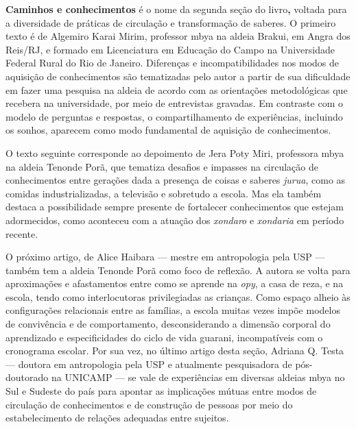 \textbf{Caminhos e conhecimentos} é o nome da segunda seção do
livro\textbf{,} voltada para a diversidade de práticas de circulação e
transformação de saberes. O primeiro texto é de Algemiro Karai Mirim,
professor mbya na aldeia Brakui, em Angra dos Reis/RJ, e formado em
Licenciatura em Educação do Campo na Universidade Federal Rural do Rio
de Janeiro. Diferenças e incompatibilidades nos modos de aquisição de
conhecimentos são tematizadas pelo autor a partir de sua dificuldade em
fazer uma pesquisa na aldeia de acordo com as orientações metodológicas
que recebera na universidade, por meio de entrevistas gravadas. Em
contraste com o modelo de perguntas e respostas, o compartilhamento de
experiências, incluindo os sonhos, aparecem como modo fundamental de
aquisição de conhecimentos.

O texto seguinte corresponde ao depoimento de Jera Poty Miri, professora
mbya na aldeia Tenonde Porã, que tematiza desafios e impasses na
circulação de conhecimentos entre gerações dada a presença de coisas e
saberes \emph{jurua}, como as comidas industrializadas, a televisão e
sobretudo a escola. Mas ela também destaca a possibilidade sempre
presente de fortalecer conhecimentos que estejam adormecidos, como
aconteceu com a atuação dos \emph{xondaro} e \emph{xondaria} em período
recente.

O próximo artigo, de Alice Haibara --- mestre em antropologia pela USP
--- também tem a aldeia Tenonde Porã como foco de reflexão. A autora se
volta para aproximações e afastamentos entre como se aprende na
\emph{opy}, a casa de reza, e na escola, tendo como interlocutoras
privilegiadas as crianças. Como espaço alheio às configurações
relacionais entre as famílias, a escola muitas vezes impõe modelos de
convivência e de comportamento, desconsiderando a dimensão corporal do
aprendizado e especificidades do ciclo de vida guarani, incompatíveis
com o cronograma escolar. Por sua vez, no último artigo desta seção,
Adriana Q. Testa --- doutora em antropologia pela USP e atualmente
pesquisadora de pós-doutorado na UNICAMP --- se vale de experiências em
diversas aldeias mbya no Sul e Sudeste do país para apontar as
implicações mútuas entre modos de circulação de conhecimentos e de
construção de pessoas por meio do estabelecimento de relações adequadas
entre sujeitos.

